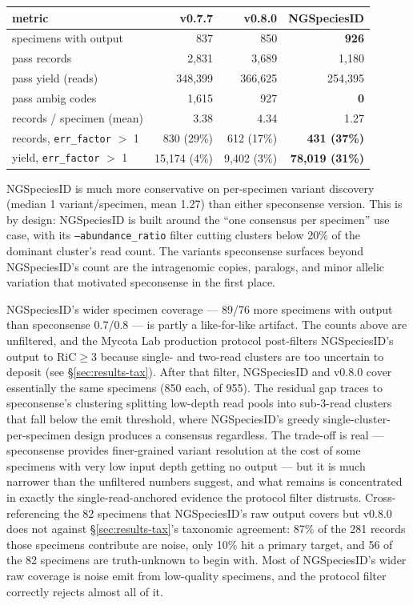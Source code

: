 \documentclass[11pt]{article}
\begin{document}
\begin{center}
\begin{tabular}{lrrr}
\toprule
metric & v0.7.7 & v0.8.0 & NGSpeciesID \\
\midrule
specimens with output & 837 & 850 & \textbf{926} \\
pass records & 2,831 & 3,689 & 1,180 \\
pass yield (reads) & 348,399 & 366,625 & 254,395 \\
pass ambig codes & 1,615 & 927 & \textbf{0} \\
records / specimen (mean) & 3.38 & 4.34 & 1.27 \\
records, \texttt{err\_factor} $>$ 1 & 830 (29\%) & 612 (17\%) & \textbf{431 (37\%)} \\
yield, \texttt{err\_factor} $>$ 1 & 15,174 (4\%) & 9,402 (3\%) & \textbf{78,019 (31\%)} \\
\bottomrule
\end{tabular}
\end{center}

NGSpeciesID is much more conservative on per-specimen variant discovery
(median 1 variant/specimen, mean 1.27) than either speconsense version.
This is by design: NGSpeciesID is built around the ``one consensus per
specimen'' use case, with its \texttt{--abundance\_ratio} filter cutting
clusters below 20\% of the dominant cluster's read count. The variants
speconsense surfaces beyond NGSpeciesID's count are the intragenomic
copies, paralogs, and minor allelic variation that motivated speconsense
in the first place.

NGSpeciesID's wider specimen coverage --- 89/76 more specimens with
output than speconsense 0.7/0.8 --- is partly a like-for-like artifact.
The counts above are unfiltered, and the Mycota Lab production protocol
post-filters NGSpeciesID's output to RiC$\geq$3 because single- and
two-read clusters are too uncertain to deposit (see
§\ref{sec:results-tax}). After that filter, NGSpeciesID and v0.8.0
cover essentially the same specimens (850 each, of 955). The
residual gap traces to speconsense's clustering splitting low-depth
read pools into sub-3-read clusters that fall below the emit
threshold, where NGSpeciesID's greedy single-cluster-per-specimen
design produces a consensus regardless. The trade-off is real ---
speconsense provides finer-grained variant resolution at the cost of
some specimens with very low input depth getting no output --- but it
is much narrower than the unfiltered numbers suggest, and what remains
is concentrated in exactly the single-read-anchored evidence the
protocol filter distrusts. Cross-referencing the 82 specimens that
NGSpeciesID's raw output covers but v0.8.0 does not against
§\ref{sec:results-tax}'s taxonomic agreement: 87\% of the 281 records
those specimens contribute are noise, only 10\% hit a primary target,
and 56 of the 82 specimens are truth-unknown to begin with. Most of
NGSpeciesID's wider raw coverage is noise emit from low-quality
specimens, and the protocol filter correctly rejects almost all of it.
\end{document}
